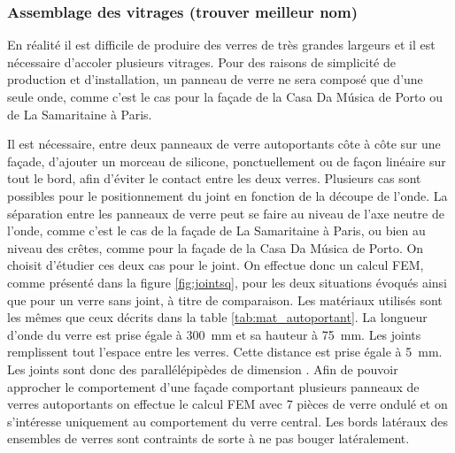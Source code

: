 \documentclass[11pt,titlepage]{article}
\begin{document}
\subsubsection{Assemblage des vitrages (trouver meilleur nom)}

En réalité il est difficile de produire des verres de très grandes largeurs et il est nécessaire d'accoler plusieurs vitrages. Pour des raisons de simplicité de production et d'installation, un panneau de verre ne sera composé que d'une seule onde, comme c'est le cas pour la façade de la Casa Da Música de Porto ou de La Samaritaine à Paris.

Il est nécessaire, entre deux panneaux de verre autoportants côte à côte sur une façade, d'ajouter un morceau de silicone, ponctuellement ou de façon linéaire sur tout le bord, afin d'éviter le contact entre les deux verres. Plusieurs cas sont possibles pour le positionnement du joint en fonction de la découpe de l'onde. La séparation entre les panneaux de verre peut se faire au niveau de l'axe neutre de l'onde, comme c'est le cas de la façade de La Samaritaine à Paris, ou bien au niveau des crêtes, comme pour la façade de la Casa Da Música de Porto. On choisit d'étudier ces deux cas pour le joint. On effectue donc un calcul \acrshort{FEM}, comme présenté dans la figure \ref{fig:jointsq}, pour les deux situations évoqués ainsi que pour un verre sans joint, à titre de comparaison. Les matériaux utilisés sont les mêmes que ceux décrits dans la table \ref{tab:mat_autoportant}. La longueur d'onde du verre est prise égale à \qty{300}{\milli\metre} et sa hauteur à \qty{75}{\milli\metre}. Les joints remplissent tout l'espace entre les verres. Cette distance est prise égale à \qty{5}{\milli\meter}. Les joints sont donc des parallélépipèdes de dimension . Afin de pouvoir approcher le comportement d'une façade comportant plusieurs panneaux de verres autoportants on effectue le calcul \acrshort{FEM} avec 7 pièces de verre ondulé et on s'intéresse uniquement au comportement du verre central. Les bords latéraux des ensembles de verres sont contraints de sorte à ne pas bouger latéralement.
\end{document}
